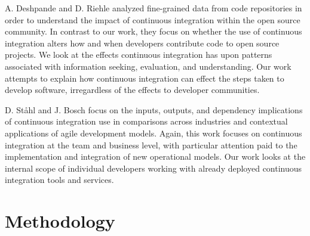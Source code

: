 \documentclass{sig-alternate}
\begin{document}
A. Deshpande and D. Riehle\cite{deshpande:ci_opensource} analyzed fine-grained data from code repositories in order to understand the impact of continuous integration within the open source community. In contrast to our work, they focus on whether the use of continuous integration alters how and when developers contribute code to open source projects. We look at the effects continuous integration has upon patterns associated with information seeking, evaluation, and understanding. Our work attempts to explain how continuous integration can effect the steps taken to develop software, irregardless of the effects to developer communities.

D. St{\aa}hl and J. Bosch\cite{staahl:modelingdiffs} focus on the inputs, outputs, and dependency implications of continuous integration use in comparisons across industries and contextual applications of agile development models. Again, this work focuses on continuous integration at the team and business level, with particular attention paid to the implementation and integration of new operational models. Our work looks at the internal scope of individual developers working with already deployed continuous integration tools and services.

\section{Methodology} \label{method}
\end{document}
